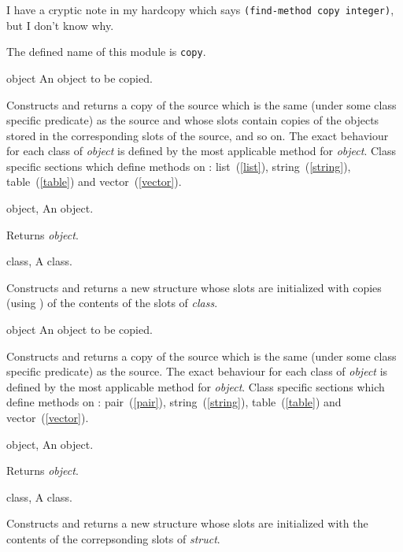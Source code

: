 %
\begin{optPrivate}
    I have a cryptic note in my hardcopy which says {\tt (find-method copy
        integer)}, but I don't know why.
\end{optPrivate}
%
\begin{optDefinition}
\noindent
The defined name of this module is {\tt copy}.

%
\begin{genericargs}
    \item[object] An object to be copied.
\end{genericargs}
%
\result%
Constructs and returns a copy of the source which is the same (under some class
specific predicate) as the source and whose slots contain copies of the objects
stored in the corresponding slots of the source, and so on.  The exact behaviour
for each class of {\em object\/} is defined by the most applicable method for
{\em object}.
%
\seealso%
Class specific sections which define methods on :
list~(\ref{list}), string~(\ref{string}), table~(\ref{table}) and
vector~(\ref{vector}).

%
\begin{specargs}
    \item[object, \classref{object}] An object.
\end{specargs}
%
\result%
Returns {\em object}.

%
\begin{specargs}
    \item[class, \classref{class}] A class.
\end{specargs}
%
\result%
Constructs and returns a new structure whose slots are initialized with copies
(using ) of the contents of the slots of {\em class}.

%
\begin{genericargs}
    \item[object] An object to be copied.
\end{genericargs}
%
\result%
Constructs and returns a copy of the source which is the same (under
some class specific predicate) as the source.  The exact behaviour for
each class of {\em object\/} is defined by the most applicable method
for {\em object}.
%
\seealso%
Class specific sections which define methods on :
pair~(\ref{pair}), string~(\ref{string}), table~(\ref{table}) and
vector~(\ref{vector}).

%
\begin{specargs}
    \item[object, \classref{object}] An object.
\end{specargs}
%
\result%
Returns {\em object}.
%
%
\begin{specargs}
    \item[class, \classref{class}] A class.
\end{specargs}
%
\result
Constructs and returns a new structure whose slots are initialized
with the contents of the correpsonding slots of {\em struct}.
%
\end{optDefinition}
